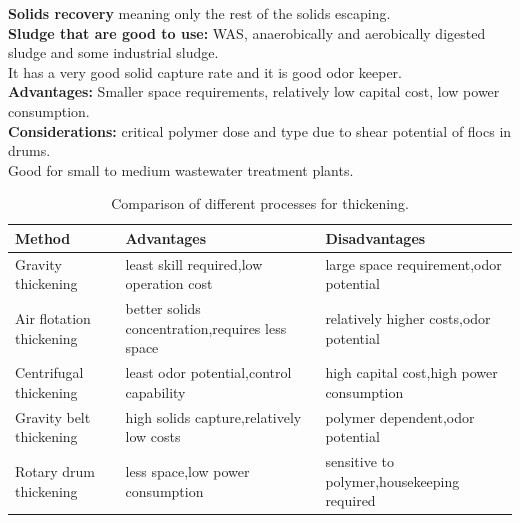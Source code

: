 \documentclass{article}
\numberwithin{equation}{section}
\begin{document}
\textbf{Solids recovery} meaning only the rest of the solids escaping.\\
\textbf{Sludge that are good to use:} WAS, anaerobically and aerobically digested sludge and some industrial sludge.\\
It has a very good solid capture rate and it is good odor keeper.\\
\textbf{Advantages:} Smaller space requirements, relatively low capital cost, low power consumption.\\
\textbf{Considerations:} critical polymer dose and type due to shear potential of flocs in drums.\\
Good for small to medium wastewater treatment plants.
\begin{table}[htbp]
\centering
\caption{Comparison of different processes for thickening.}
\label{tab:thickening_methods}
\begin{tabular}{p{4cm}p{5cm}p{5cm}}
\toprule
\textbf{Method} & \textbf{Advantages} & \textbf{Disadvantages} \\
\midrule
Gravity thickening & least skill required,\newline low operation cost & large space requirement,\newline odor potential \\
Air flotation thickening & better solids concentration,\newline requires less space & relatively higher costs,\newline odor potential \\
Centrifugal thickening & least odor potential,\newline control capability & high capital cost,\newline high power consumption \\
Gravity belt thickening & high solids capture,\newline relatively low costs & polymer dependent,\newline odor potential \\
Rotary drum thickening & less space,\newline low power consumption & sensitive to polymer,\newline housekeeping required \\
\bottomrule
\end{tabular}
\end{table}
\end{document}
